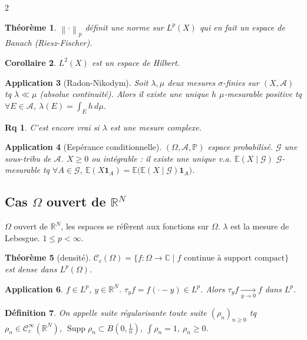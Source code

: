 \documentclass[10pt,a4paper]{article}
\theoremstyle{plan}
\newtheorem{theoreme}{Théorème}
\newtheorem{definition}[theoreme]{Définition}
\newtheorem{corollaire}[theoreme]{Corollaire}
\newtheorem{application}[theoreme]{Application}
\theoremstyle{planex}   %
\newtheorem*{remarque*}{Rq}
\newcommand{\R}{\mathbb{R}}
\newcommand{\C}{\mathbb{C}}
\newcommand{\E}{\mathbb{E}}
\newcommand{\PP}{\mathbb{P}}
\newcommand{\Cc}{\mathcal{C}}
\newcommand{\tribu}{\mathcal{A}}
\newcommand{\norm}[1]{\left\lVert #1\right\rVert}
\newcommand{\Lp}[1][p]{L^{#1}}
\DeclareMathOperator{\Supp}{Supp}
\begin{document}
\begin{multicols}{2}
\begin{theoreme}
$\norm{\cdot}_p$ définit une norme sur $\Lp(X)$ qui en fait un espace de Banach (Riesz-Fischer).
\end{theoreme}

\begin{corollaire}
$L^2(X)$ est un espace de Hilbert.
\end{corollaire}

\begin{application}[Radon-Nikodym]
Soit $\lambda, \mu$ deux mesures $\sigma$-finies sur $(X,\tribu)$ tq $\lambda \ll \mu$ (absolue continuité). Alors il existe une unique $h$ $\mu$-mesurable positive tq $\forall E \in \tribu$, $\lambda(E) = \int_E h\,d\mu$.
\end{application}

\begin{remarque*}
C'est encore vrai si $\lambda$ est une mesure complexe.
\end{remarque*}

\begin{application}[Espérance conditionnelle]
$(\Omega, \tribu, \PP)$ espace probabilisé. $\mathcal{G}$ une sous-tribu de $\tribu$. $X \ge 0$ ou intégrable : il existe une unique v.a. $\E(X \mid \mathcal{G})$ $\mathcal{G}$-mesurable tq $\forall A \in \mathcal{G}$, $\E(X \mathbf{1}_A) = \E\big( \E(X \mid \mathcal{G}) \mathbf{1}_A \big)$.
\end{application}

\subsection{Cas $\Omega$ ouvert de $\R^N$}
$\Omega$ ouvert de $\R^N$, les espaces se réfèrent aux fonctions sur $\Omega$. $\lambda$ est la mesure de Lebesgue. $1 \le p < \infty$.

\begin{theoreme}[densité]
$\Cc_c(\Omega) = \{ f : \Omega \to \C \mid f \text{ continue à support compact} \}$ est dense dans $\Lp(\Omega)$.
\end{theoreme}

\begin{application}
$f \in \Lp$, $y \in \R^N$. $\tau_y f = f(\cdot - y) \in \Lp$. Alors $\tau_y f \xrightarrow[y \to 0]{} f$ dans $\Lp$.
\end{application}

\begin{definition}
On appelle suite régularisante toute suite $(\rho_n)_{n \ge 0}$ tq $\rho_n \in \Cc_c^\infty(\R^N)$, $\Supp \rho_n \subset B(0, \frac{1}{n})$, $\int \rho_n = 1$, $\rho_n \ge 0$.
\end{definition}


\end{multicols}
\end{document}
